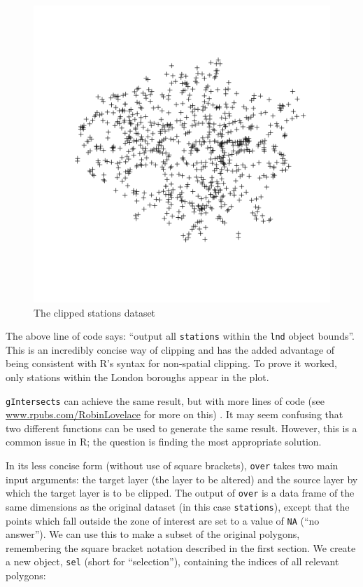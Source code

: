\documentclass[]{article}
\begin{document}
\begin{figure}[htbp]
\centering
\includegraphics{figure/The_clipped_stations_dataset.png}
\caption{The clipped stations dataset}
\end{figure}

The above line of code says: ``output all \texttt{stations} within the
\texttt{lnd} object bounds''. This is an incredibly concise way of
clipping and has the added advantage of being consistent with R's syntax
for non-spatial clipping. To prove it worked, only stations within the
London boroughs appear in the plot.

\texttt{gIntersects} can achieve the same result, but with more lines of
code (see
\href{http://www.rpubs.com/RobinLovelace/11796}{www.rpubs.com/RobinLovelace}
for more on this) . It may seem confusing that two different functions
can be used to generate the same result. However, this is a common issue
in R; the question is finding the most appropriate solution.

In its less concise form (without use of square brackets), \texttt{over}
takes two main input arguments: the target layer (the layer to be
altered) and the source layer by which the target layer is to be
clipped. The output of \texttt{over} is a data frame of the same
dimensions as the original dataset (in this case \texttt{stations}),
except that the points which fall outside the zone of interest are set
to a value of \texttt{NA} (``no answer''). We can use this to make a
subset of the original polygons, remembering the square bracket notation
described in the first section. We create a new object, \texttt{sel}
(short for ``selection''), containing the indices of all relevant
polygons:
\end{document}
